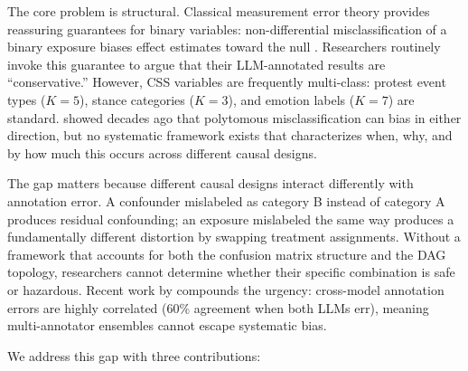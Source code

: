 \documentclass[11pt]{article}
\begin{document}
The core problem is structural.
Classical measurement error theory provides reassuring guarantees for binary variables: non-differential misclassification of a binary exposure biases effect estimates toward the null \citep{bross1954}.
Researchers routinely invoke this guarantee to argue that their LLM-annotated results are ``conservative.''
However, CSS variables are frequently multi-class: protest event types ($K=5$), stance categories ($K=3$), and emotion labels ($K=7$) are standard.
\citet{brenner1993} showed decades ago that polytomous misclassification can bias in either direction, but no systematic framework exists that characterizes when, why, and by how much this occurs across different causal designs.

The gap matters because different causal designs interact differently with annotation error.
A confounder mislabeled as category B instead of category A produces residual confounding; an exposure mislabeled the same way produces a fundamentally different distortion by swapping treatment assignments.
Without a framework that accounts for both the confusion matrix structure and the DAG topology, researchers cannot determine whether their specific combination is safe or hazardous.
Recent work by \citet{kim2025} compounds the urgency: cross-model annotation errors are highly correlated (60\% agreement when both LLMs err), meaning multi-annotator ensembles cannot escape systematic bias.

We address this gap with three contributions:
\end{document}
